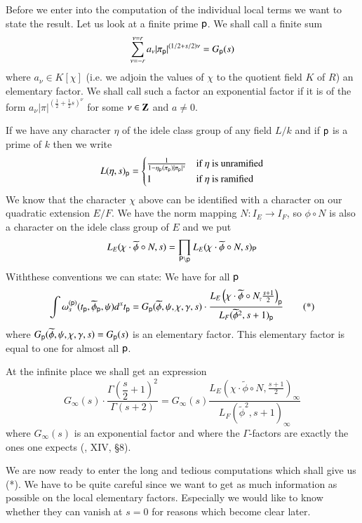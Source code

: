 Before we enter into the computation of the individual local terms we want to state the result. Let us look at a finite prime $\mathsf{p}$. We shall call a finite sum
$$
\sum\limits^{\nu=r}_{\nu=-r}a_{\nu}|\pi_{\mathsf{p}}|^{(1/2+s/2)\nu}=G_{\mathsf{p}}(s)
$$
where $a_{\nu}\in K[\chi]$ (i.e. we adjoin the values of $\chi$ to the quotient field $K$ of $R$) an elementary factor. We shall call such a factor an exponential factor if it is of the form $a_{\nu}|\pi|^{(\frac{1}{2}+\frac{1}{2}s)^{\nu}}$ for some $\nu\in \mathbf{Z}$ and $a\neq 0$.

If we have any character $\eta$ of the idele class group of any field $L/k$ and if $\mathsf{p}$ is a prime of $k$ then we write
$$
L(\eta,s)_{\mathsf{p}}=
\begin{cases}
\frac{1}{1-\eta_{\mathsf{p}}(\pi_{\mathsf{p}})|\pi_{\mathsf{p}}|^{s}} & \text{if~ } \eta \text{~ is unramified}\\
1 & \text{if~ } \eta \text{~ is ramified}
\end{cases}
$$
We know that the character $\chi$ above can be identified with a character on our quadratic extension $E/F$. We have the norm mapping $N:I_{E}\to I_{F}$, so $\phi\circ N$ is also a character on the idele class group of $E$ and we put
$$
L_{E}(\chi\cdot \widetilde{\phi}\circ N,s)=\prod\limits_{\mathsf{P}\backslash \mathsf{p}}L_{E}(\chi\cdot \widetilde{\phi}\circ N,s)_{\mathsf{P}}
$$
With\pageoriginale these conventions we can state: We have for all $\mathsf{p}$
\begin{equation*}
 \int \omega^{(\mathsf{p})}_{s}(t_{\mathsf{p}},\widetilde{\phi}_{\mathsf{p}},\psi)d^{x}t_{\mathsf{p}}=G_{\mathsf{p}}(\widetilde{\phi},\psi,\chi,\gamma,s)\cdot \dfrac{L_{E}\left(\chi\cdot \widetilde{\phi}\circ N_{\overline{,}}\frac{s+1}{2}\right)_{\mathsf{p}}}{L_{F}(\widetilde{\phi}^{2},s+1)_{\mathsf{p}}}\tag{*}
\end{equation*}
where $G_{\mathsf{p}}(\widetilde{\phi},\psi,\chi,\gamma,s)=G_{\mathsf{p}}(s)$ is an elementary factor. This elementary factor is equal to one for almost all $\mathsf{p}$.

At the infinite place we shall get an expression
$$
G_{\infty}(s)\cdot \frac{\Gamma\left(\dfrac{s}{2}+1\right)^{2}}{\Gamma(s+2)}=G_{\infty}(s)\frac{L_{E}\left(\chi\cdot \widetilde{\phi}\circ N,\frac{s+1}{2}\right)_{\infty}}{L_{F}(\widetilde{\phi}^{2},s+1)_{\infty}}
$$
where $G_{\infty}(s)$ is an exponential factor and where the $\Gamma$-factors are exactly the ones one expects (\cite{art2-key12}, XIV, \S8).

We are now ready to enter the long and tedious computations which shall give us (*). We have to be quite careful since we want to get as much information as possible on the local elementary factors. Especially we would like to know whether they can vanish at $s=0$ for reasons which become clear later.

